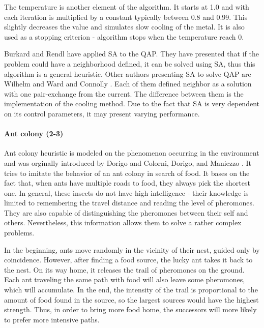 The temperature is another element of the algorithm.
It starts at 1.0 and with each iteration is multiplied by a constant typically between 0.8 and 0.99.
This slightly decreases the value and simulates slow cooling of the metal.
It is also used as a stopping criterion - algorithm stops when the temperature reach 0.

Burkard and Rendl \cite{burkard1984thermodynamically} have applied SA to the QAP.
They have presented that if the problem could have a neighborhood defined, it can be solved using SA, thus this algorithm is a general heuristic.
Other authors presenting SA to solve QAP are Wilhelm and Ward \cite{wilhelm1987solving} and Connolly \cite{connolly1990improved}.
Each of them defined neighbor as a solution with one pair-exchange from the current.
The difference between them is the implementation of the cooling method.
Due to the fact that SA is very dependent on its control parameters, it may present varying performance.

\paragraph{Ant colony (2-3)}

Ant colony heuristic is modeled on the phenomenon occurring in the environment and was orginally introduced by Dorigo \cite{dorigo1992optimization} and Colorni, Dorigo, and Maniezzo \cite{dorigo1996ant}.
It tries to imitate the behavior of an ant colony in search of food.
It bases on the fact that, when ants have multiple roads to food, they always pick the shortest one.
In general, these insects do not have high intelligence - their knowledge is limited to remembering the travel distance and reading the level of pheromones.
They are also capable of distinguishing the pheromones between their self and others.
Nevertheless, this information allows them to solve a rather complex problems.

In the beginning, ants move randomly in the vicinity of their nest, guided only by coincidence.
However, after finding a food source, the lucky ant takes it back to the nest.
On its way home, it releases the trail of pheromones on the ground.
Each ant traveling the same path with food will also leave some pheromones, which will accumulate.
In the end, the intensity of the trail is proportional to the amount of food found in the source, so the largest sources would have the highest strength.
Thus, in order to bring more food home, the successors will more likely to prefer more intensive paths.

